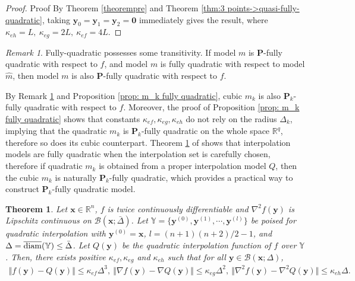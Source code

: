 \documentclass[colorlinks=true, linkcolor=blue, citecolor=blue, urlcolor=blue]{article}
\theoremstyle{plain}
\newtheorem{theorem}{Theorem}[section]
\theoremstyle{definition}
\theoremstyle{remark}
\newtheorem{remark}{Remark}
\begin{document}
\begin{proof}{Proof}
     By Theorem \ref{theorempre} and Theorem \ref{thm:3 points->quasi-fully-quadratic}, taking $\bm y_0=\bm y_1=\bm y_2=\bm 0$ immediately gives the result, where $\kappa_{eh}=L,\ \kappa_{eg}=2L,\ \kappa_{ef}=4L$.  
\end{proof}

\begin{remark}\label{remark: transitivity of fully quadratic}
    Fully-quadratic possesses some transitivity. If model $m$ is $\bm P$-fully quadratic with respect to $f$, and model $m$ is fully quadratic with respect to model $\hat{m}$, then model $m$ is also $\bm P$-fully quadratic with respect to $f$.
\end{remark}

By Remark \ref{remark: transitivity of fully quadratic} and Proposition \ref{prop: m_k fully quadratic}, cubic $m_k$ is also $\bm P_k$-fully quadratic with respect to $f$. Moreover, the proof of Proposition \ref{prop: m_k fully quadratic} shows that constants $\kappa_{ef},\kappa_{eg},\kappa_{eh}$ do not rely on the radius $\Delta_k$, implying that the quadratic $m_k$ is $\bm P_k$-fully quadratic on the whole space $\mathbb{R}^q$, therefore so does its cubic counterpart. Theorem \ref{thm: interpolation model is fully quadratic} of \citet{Audet2017DerivativeFreeAB} shows that interpolation models are fully quadratic when the interpolation set is carefully chosen, therefore if quadratic $m_k$ is obtained from a proper interpolation model $Q$, then the cubic $m_k$ is naturally $\bm P_k$-fully quadratic, which provides a practical way to construct $\bm P_k$-fully quadratic model. 
\begin{theorem}\label{thm: interpolation model is fully quadratic}
    Let $\bm x\in\mathbb{R}^n$, $f$ is twice continuously differentiable and $\nabla^2 f(\bm y)$ is Lipschitz continuous on $\mathcal{B}(\bm x;\bar{\Delta})$.  Let $\mathbb{Y}=\{\bm y^{(0)},\bm y^{(1)},\cdots,\bm y^{(l)}\}$ be poised for quadratic interpolation with $\bm y^{(0)}=\bm x$, $l=(n+1)(n+2)/2-1$, and $\Delta=\overline{\rm diam}(\mathbb{Y})\leq \bar{\Delta}$. Let $Q(\bm y)$ be the quadratic interpolation function of $f$ over $\mathbb{Y}$. Then, there exists positive $\kappa_{ef},\kappa_{eg}$ and $\kappa_{eh}$ such that for all $\bm y\in\mathcal{B}(\bm x;\Delta)$,
    \begin{equation*}
    \begin{aligned}
        \Vert f(\bm y)-Q(\bm y)\Vert\leq \kappa_{ef}\Delta^{3},\ 
        \Vert \nabla f(\bm y)-\nabla Q(\bm y)\Vert\leq \kappa_{eg}\Delta^{2},\ 
        \Vert \nabla^2 f(\bm y)-\nabla^2 Q(\bm y)\Vert\leq \kappa_{eh}\Delta.
    \end{aligned}     
    \end{equation*}
 
\end{theorem}
\end{document}
